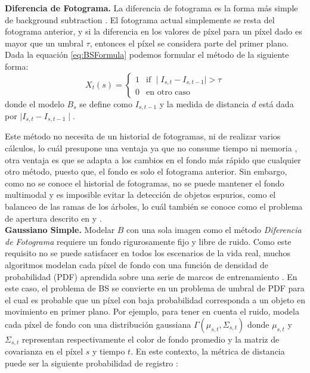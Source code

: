 \textbf{Diferencia de Fotograma.}
La diferencia de fotograma es la forma más simple de background subtraction \cite{DeepjoySarat}. El fotograma actual simplemente se resta del fotograma anterior, y si la diferencia en los valores de píxel para un píxel dado es mayor que un umbral $\tau$, entonces el píxel se considera parte del primer plano. Dada la equación \ref{eq:BSFormula} podemos formular el método de la siguiente forma:
$$
X_t(s) = \left\{
\begin{array}{ll}
	1 & \mbox{if } \mid I_{s,t} - I_{s,t-1} \mid > \tau \\
	0 & \mbox{en otro caso}
\end{array}
\right.
$$
donde el modelo $B_s$ se define como $I_{s,t-1}$ y la medida de distancia $d$ está dada por $\mid I_{s,t} - I_{s,t-1} \mid$.

Este método no necesita de un historial de fotogramas, ni de realizar varios cálculos, lo cuál presupone una ventaja ya que no consume tiempo ni memoria \cite{InsafSlimane}, otra ventaja es que se adapta a los cambios en el fondo más rápido que cualquier otro método, puesto que, el fondo es solo el fotograma anterior. Sin embargo, como no se conoce el historial de fotogramas, no se puede mantener el fondo multimodal y es imposible evitar la detección de objetos espurios, como el balanceo de las ramas de los árboles, lo cuál también se conoce como el problema de apertura descrito en \cite{ApewokinApewokinWillsWillsGentile} y \cite{KentaroJohnBarryBrian}.\\

\textbf{Gaussiano Simple.}
Modelar $B$ con una sola imagen como el método \textit{Diferencia de Fotograma} requiere un fondo rigurosamente fijo y libre de ruido. Como este requisito no se puede satisfacer en todos los escenarios de la vida real, muchos algoritmos modelan cada píxel de fondo con una función de densidad de probabilidad (PDF) aprendida sobre una serie de marcos de entrenamiento \cite{YannickPierreMarcBrunoHeleneChristophe}. En este caso, el problema de BS se convierte en un problema de umbral de PDF para el cual es probable que un píxel con baja probabilidad corresponda a un objeto en movimiento en primer plano. Por ejemplo, para tener en cuenta el ruido, \cite{WrenAzarbayejaniDarrellPentland} modela cada píxel de fondo con una distribución gaussiana $\Gamma(\mu_{s,t}, \Sigma_{s,t})$ donde  $\mu_{s,t}$ y $\Sigma_{s,t}$ representan respectivamente el color de fondo promedio y la matriz de covarianza en el píxel $s$ y tiempo $t$. En este contexto, la métrica de distancia puede ser la siguiente probabilidad de registro \cite{YannickPierreMarcBrunoHeleneChristophe}:

